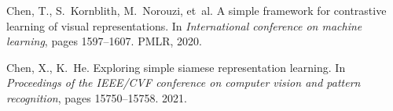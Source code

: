 \documentclass{article}
\begin{document}
\begin{thebibliography}{10}
	Chen, T., S.~Kornblith, M.~Norouzi, et~al.
	\newblock A simple framework for contrastive learning of visual
	representations.
	\newblock In \emph{International conference on machine learning}, pages
	1597--1607. PMLR, 2020.
	
	Chen, X., K.~He.
	\newblock Exploring simple siamese representation learning.
	\newblock In \emph{Proceedings of the IEEE/CVF conference on computer vision
		and pattern recognition}, pages 15750--15758. 2021.
	
\end{thebibliography}
\end{document}
